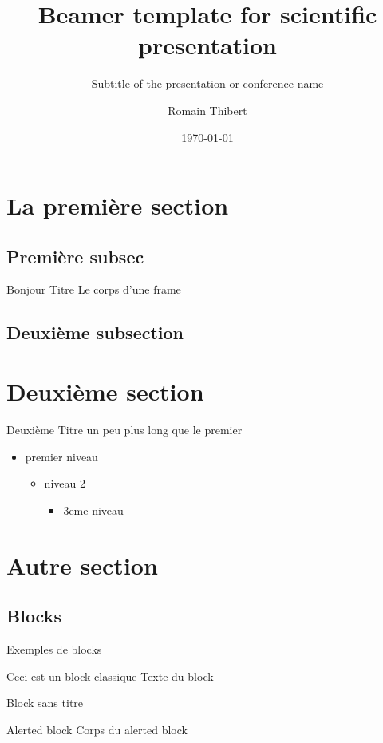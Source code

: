 \documentclass[aspectratio=169]{beamer}
\title{Beamer template for scientific presentation}
\subtitle{Subtitle of the presentation or conference name}
\author[R.Thibert]{Romain Thibert}
\date{\today}
\begin{document}

\section{La première section}

\subsection{Première subsec}

\begin{frame}{Bonjour Titre}
Le corps d'une frame
\end{frame}

\subsection{Deuxième subsection}

\section{Deuxième section}

\begin{frame}{Deuxième Titre un peu plus long que le premier}
\begin{itemize}
    \item premier niveau
    \begin{itemize}
        \item niveau 2
        \begin{itemize}
            \item 3eme niveau
        \end{itemize}
    \end{itemize}
\end{itemize}
\end{frame}

\section{Autre section}

\subsection{Blocks}

\begin{frame}{Exemples de blocks}
    \begin{block}{Ceci est un block classique}
        Texte du block
    \end{block}
    \begin{block}{}
        Block sans titre
    \end{block}
    \begin{alertblock}{Alerted block}
        Corps du alerted block
    \end{alertblock}
\end{frame}
\end{document}
